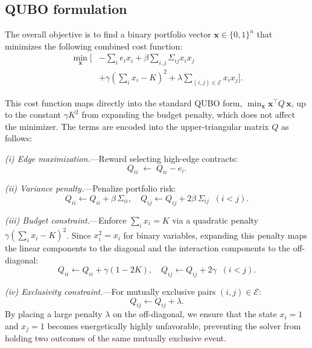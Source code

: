 \documentclass[aps, reprint, prl, twocolumn, superscriptaddress,amsmath,amssymb,noeprint]{revtex4-2}
\begin{document}
\subsection{QUBO formulation}

The overall objective is to find a binary portfolio vector $\mathbf{x} \in \{0,1\}^n$ that minimizes the following combined cost function:
\begin{equation}
\begin{split}
  \min_{\mathbf{x}} \bigg[ &-\sum_{i} e_i x_i + \beta \sum_{i,j} \Sigma_{ij} x_i x_j \\
  &+ \gamma \left( \sum_i x_i - K \right)^2 + \lambda \sum_{(i,j) \in \mathcal{E}} x_i x_j \bigg].
\end{split}
  \label{eq:objective}
\end{equation}

This cost function maps directly into the standard QUBO form, $\min_{\mathbf{x}} \mathbf{x}^\top Q \, \mathbf{x}$, up to the constant $\gamma K^2$ from expanding the budget penalty, which does not affect the minimizer.  The terms are encoded into the upper-triangular matrix $Q$ as follows:

\textit{(i) Edge maximization.}---Reward selecting high-edge contracts:
\begin{equation}
  Q_{ii} \;\leftarrow\; Q_{ii} - e_i.
\end{equation}

\textit{(ii) Variance penalty.}---Penalize portfolio risk:
\begin{equation}
  Q_{ii} \leftarrow Q_{ii} + \beta\,\Sigma_{ii}, \quad
  Q_{ij} \leftarrow Q_{ij} + 2\beta\,\Sigma_{ij} \;\; (i<j).
\end{equation}

\textit{(iii) Budget constraint.}---Enforce $\sum_i x_i = K$ via a
quadratic penalty $\gamma(\sum_i x_i - K)^2$. Since $x_i^2 = x_i$ for binary variables, expanding this penalty maps the linear components to the diagonal and the interaction components to the off-diagonal:
\begin{equation}
  Q_{ii} \leftarrow Q_{ii} + \gamma(1-2K), \quad
  Q_{ij} \leftarrow Q_{ij} + 2\gamma \;\; (i<j).
\end{equation}

\textit{(iv) Exclusivity constraint.}---For mutually exclusive pairs
$(i,j) \in \mathcal{E}$:
\begin{equation}
  Q_{ij} \leftarrow Q_{ij} + \lambda.
  \label{eq:exclusivity}
\end{equation}
By placing a large penalty $\lambda$ on the off-diagonal, we ensure that the state $x_i = 1$ and $x_j = 1$ becomes energetically highly unfavorable, preventing the solver from holding two outcomes of the same mutually exclusive event.
\end{document}
